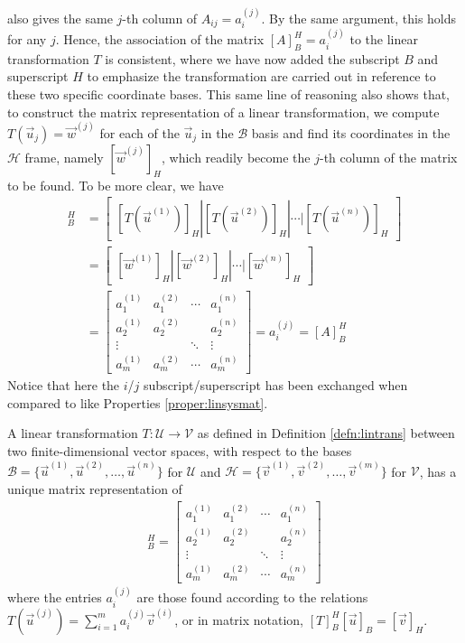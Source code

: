 also gives the same $j$-th column of $A_{ij} = a_i^{(j)}$. By the same argument, this holds for any $j$. Hence, the association of the matrix $[A]_B^H = a_i^{(j)}$ to the linear transformation $T$ is consistent, where we have now added the subscript $B$ and superscript $H$ to emphasize the transformation are carried out in reference to these two specific coordinate bases. This same line of reasoning also shows that, to construct the matrix representation of a linear transformation, we compute $T(\vec{u}_j) = \vec{w}^{(j)}$ for each of the $\vec{u}_j$ in the $\mathcal{B}$ basis and find its coordinates in the $\mathcal{H}$ frame, namely $[\vec{w}^{(j)}]_H$, which readily become the $j$-th column of the matrix to be found. To be more clear, we have
\begin{align*}
[T]_B^H &= 
\begin{bmatrix}
[T(\vec{u}^{(1)})]_H | [T(\vec{u}^{(2)})]_H | \cdots | [T(\vec{u}^{(n)})]_H
\end{bmatrix} \\
&=
\begin{bmatrix}
[\vec{w}^{(1)}]_H | [\vec{w}^{(2)}]_H | \cdots | [\vec{w}^{(n)}]_H
\end{bmatrix} \\
&= 
\begin{bmatrix}
a_1^{(1)} & a_1^{(2)} & \cdots & a_1^{(n)} \\
a_2^{(1)} & a_2^{(2)} &  & a_2^{(n)} \\
\vdots & & \ddots & \vdots \\
a_m^{(1)} & a_m^{(2)} & \cdots & a_m^{(n)}
\end{bmatrix}
= a_i^{(j)} = [A]_B^H
\end{align*}
Notice that here the $i$/$j$ subscript/superscript has been exchanged when compared to like Properties \ref{proper:linsysmat}.
\begin{defn}
\label{defn:matrixrepoflintrans}
A linear transformation $T: \mathcal{U} \to \mathcal{V}$ as defined in Definition \ref{defn:lintrans} between two finite-dimensional vector spaces, with respect to the bases $\mathcal{B} = \{\vec{u}^{(1)}, \vec{u}^{(2)}, \ldots, \vec{u}^{(n)}\}$ for $\mathcal{U}$ and $\mathcal{H} = \{\vec{v}^{(1)}, \vec{v}^{(2)}, \ldots, \vec{v}^{(m)}\}$ for $\mathcal{V}$, has a unique matrix representation of
\begin{align*}
[T]_B^H = 
\begin{bmatrix}
a_1^{(1)} & a_1^{(2)} & \cdots & a_1^{(n)} \\
a_2^{(1)} & a_2^{(2)} &  & a_2^{(n)} \\
\vdots & & \ddots & \vdots \\
a_m^{(1)} & a_m^{(2)} & \cdots & a_m^{(n)}
\end{bmatrix}
\end{align*}
where the entries $a_i^{(j)}$ are those found according to the relations $T(\vec{u}^{(j)}) = \sum_{i=1}^{m} a_i^{(j)}\vec{v}^{(i)}$, or in matrix notation, $[T]_B^H [\vec{u}]_B = [\vec{v}]_H$.
\end{defn}
